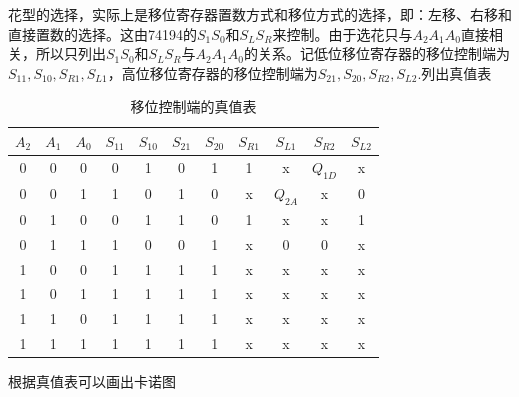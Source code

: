 \documentclass{ctexart}
\begin{document}
花型的选择，实际上是移位寄存器置数方式和移位方式的选择，即：左移、右移和直接置数的选择。这由74194的$S_1 S_0$和$S_L S_R$来控制。由于选花只与$A_2 A_1 A_0$直接相关，所以只列出$S_1 S_0$和$S_L S_R$与$A_2 A_1 A_0$的关系。记低位移位寄存器的移位控制端为$S_{11},S_{10},S_{R1},S_{L1}$，高位移位寄存器的移位控制端为$S_{21},S_{20},S_{R2},S_{L2}$.列出真值表
\begin{table}[H]
    \centering
    \caption{移位控制端的真值表}
    \begin{tabular}{ccc|cccc|cccc}
    \hline 
        $A_2$ & $A_1$ & $A_0$ & $S_{11}$ & $S_{10}$ & $S_{21}$ & $S_{20}$ & $S_{R1}$ & $S_{L1}$ & $S_{R2}$ & $S_{L2}$\\ \hline 
        0 & 0 & 0 & 0 & 1 & 0 & 1 & 1 & x & $Q_{1 D}$ & x \\ \hline
        0 & 0 & 1 & 1 & 0 & 1 & 0 & x & $Q_{2 A}$ & x & 0 \\ \hline
        0 & 1 & 0 & 0 & 1 & 1 & 0 & 1 & x & x & 1 \\ \hline
        0 & 1 & 1 & 1 & 0 & 0 & 1 & x & 0 & 0 & x \\ \hline
        1 & 0 & 0 & 1 & 1 & 1 & 1 & x & x & x & x \\ \hline
        1 & 0 & 1 & 1 & 1 & 1 & 1 & x & x & x & x \\ \hline
        1 & 1 & 0 & 1 & 1 & 1 & 1 & x & x & x & x \\ \hline
        1 & 1 & 1 & 1 & 1 & 1 & 1 & x & x & x & x \\ \hline
    \end{tabular}
    \label{移位控制端的真值表}
\end{table}
根据真值表可以画出卡诺图
\end{document}
